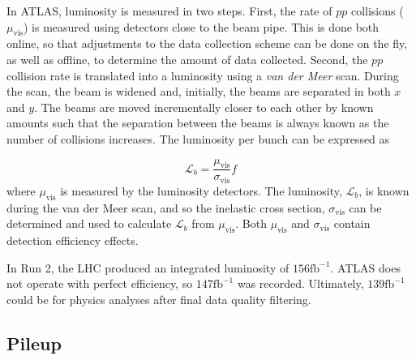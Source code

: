 

In \ac{ATLAS}, luminosity is measured in two steps. First, the rate of $pp$ collisions ($\mu_{\textrm{vis}}$) is measured using detectors close to the beam pipe. This is done both online, so that adjustments to the data collection scheme can be done on the fly, as well as offline, to determine the amount of data collected. Second, the $pp$ collision rate is translated into a luminosity using a \emph{van der Meer} scan. During the scan, the beam is widened and, initially, the beams are separated in both $x$ and $y$. The beams are moved incrementally closer to each other by known amounts such that the separation between the beams is always known as the number of collisions increases. \cite{atlas-vdm} The luminosity per bunch can be expressed as

\begin{equation}
\mathcal{L}_b = \frac{\mu_{\textrm{vis}}}{\sigma_{\textrm{vis}}} f
\end{equation}
where $\mu_{\textrm{vis}}$ is measured by the luminosity detectors. The luminosity, $\mathcal{L}_b$, is known during the van der Meer scan, and so the inelastic cross section, $\sigma_{\textrm{vis}}$ can be determined and used to calculate $\mathcal{L}_b$ from $\mu_{\textrm{vis}}$. Both $\mu_{\textrm{vis}}$ and $\sigma_{\textrm{vis}}$ contain detection efficiency effects. \cite{atlas-lumi}

In Run 2, the \ac{LHC} produced an integrated luminosity of $156 \textrm{fb}^{-1}$. \ac{ATLAS} does not operate with perfect efficiency, so $147 \textrm{fb}^{-1}$ was recorded. Ultimately, $139 \textrm{fb}^{-1}$ could be for physics analyses after final data quality filtering.



\subsection{Pileup}

